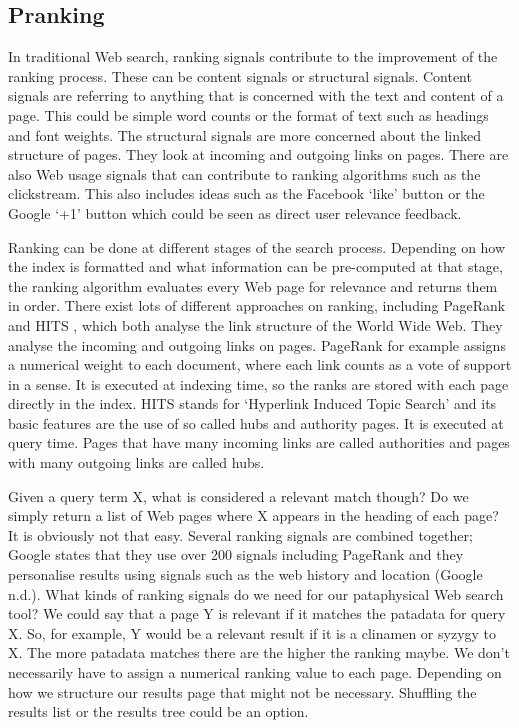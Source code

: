 \subsection{Pranking}

In traditional Web search, ranking signals contribute to the improvement of the ranking process. These can be content signals or structural signals. Content signals are referring to anything that is concerned with the text and content of a page. This could be simple word counts or the format of text such as headings and font weights. The structural signals are more concerned about the linked structure of pages. They look at incoming and outgoing links on pages. There are also Web usage signals that can contribute to ranking algorithms such as the clickstream. This also includes ideas such as the Facebook `like' button or the Google `+1' button which could be seen as direct user relevance feedback.

Ranking can be done at different stages of the search process. Depending on how the index is formatted and what information can be pre-computed at that stage, the ranking algorithm evaluates every Web page for relevance and returns them in order. There exist lots of different approaches on ranking, including PageRank \autocite{Brin1998} and HITS \autocite{Kleinberg1999}, which both analyse the link structure of the World Wide Web. They analyse the incoming and outgoing links on pages. PageRank for example assigns a numerical weight to each document, where each link counts as a vote of support in a sense. It is executed at indexing time, so the ranks are stored with each page directly in the index. HITS stands for `Hyperlink Induced Topic Search' and its basic features are the use of so called hubs and authority pages. It is executed at query time. Pages that have many incoming links are called authorities and pages with many outgoing links are called hubs.

Given a query term X, what is considered a relevant match though? Do we simply return a list of Web pages where X appears in the heading of each page? It is obviously not that easy. Several ranking signals are combined together; Google states that they use over 200 signals including PageRank and they personalise results using signals such as the web history and location (Google n.d.).
What kinds of ranking signals do we need for our pataphysical Web search tool? We could say that a page Y is relevant if it matches the patadata for query X. So, for example, Y would be a relevant result if it is a clinamen or syzygy to X. The more patadata matches there are the higher the ranking maybe. We don't necessarily have to assign a numerical ranking value to each page. Depending on how we structure our results page that might not be necessary. Shuffling the results list or the results tree could be an option.


